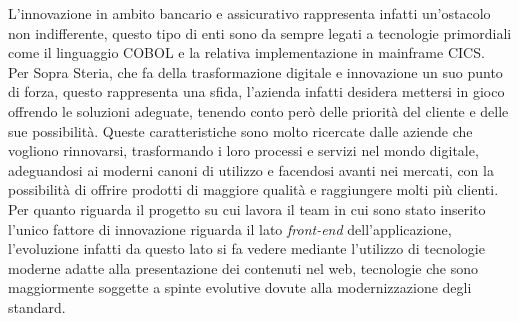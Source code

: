 	L'innovazione in ambito bancario e assicurativo rappresenta infatti un'ostacolo non indifferente, questo tipo di enti sono da sempre legati a tecnologie primordiali come il linguaggio COBOL e la relativa implementazione in mainframe CICS.\\
	
	Per Sopra Steria, che fa della trasformazione digitale e innovazione un suo punto di forza, questo rappresenta una sfida, l'azienda infatti desidera mettersi in gioco offrendo le soluzioni adeguate, tenendo conto però delle priorità del cliente e delle sue possibilità. Queste caratteristiche sono molto ricercate dalle aziende che vogliono rinnovarsi, trasformando i loro processi e servizi nel mondo digitale, adeguandosi ai moderni canoni di utilizzo e facendosi avanti nei mercati, con la possibilità di offrire prodotti di maggiore qualità e raggiungere molti più clienti.\\
	
	Per quanto riguarda il progetto su cui lavora il team in cui sono stato inserito l'unico fattore di innovazione riguarda il lato  \textit{front-end} dell'applicazione, l'evoluzione infatti da questo lato si fa vedere mediante l'utilizzo di tecnologie moderne adatte alla presentazione dei contenuti	nel web, tecnologie che sono maggiormente soggette a spinte evolutive dovute alla modernizzazione degli standard.